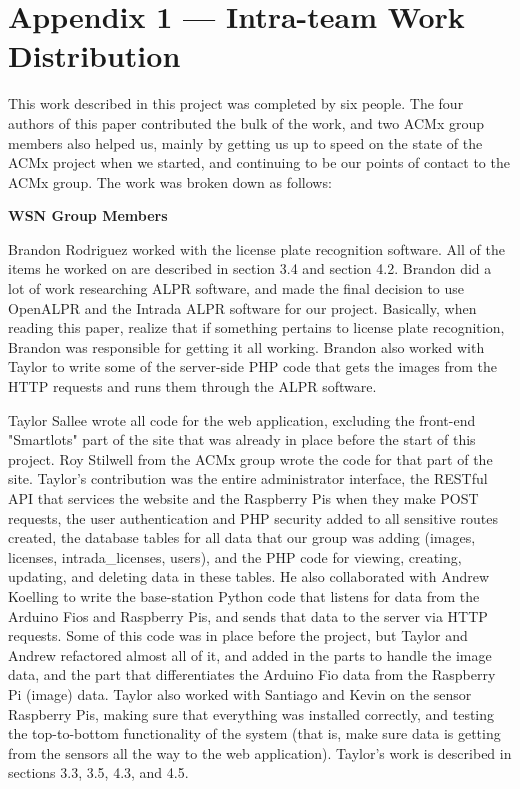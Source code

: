 \documentclass[11pt, oneside, fullpage, doublespace]{article}
\begin{document}
\section*{Appendix 1 --- Intra-team Work Distribution}

This work described in this project was completed by six people. The four authors of this paper contributed the bulk of the work, and two ACMx group members also helped us, mainly by getting us up to speed on the state of the ACMx project when we started, and continuing to be our points of contact to the ACMx group. The work was broken down as follows:

\textbf{WSN Group Members}

Brandon Rodriguez worked with the license plate recognition software. All of the items he worked on are described in section 3.4 and section 4.2. Brandon did a lot of work researching ALPR software, and made the final decision to use OpenALPR and the Intrada ALPR software for our project. Basically, when reading this paper, realize that if something pertains to license plate recognition, Brandon was responsible for getting it all working. Brandon also worked with Taylor to write some of the server-side PHP code that gets the images from the HTTP requests and runs them through the ALPR software.

Taylor Sallee wrote all code for the web application, excluding the front-end "Smartlots" part of the site that was already in place before the start of this project. Roy Stilwell from the ACMx group wrote the code for that part of the site. Taylor's contribution was the entire administrator interface, the RESTful API that services the website and the Raspberry Pis when they make POST requests, the user authentication and PHP security added to all sensitive routes created, the database tables for all data that our group was adding (images, licenses, intrada\_licenses, users), and the PHP code for viewing, creating, updating, and deleting data in these tables. He also collaborated with Andrew Koelling to write the base-station Python code that listens for data from the Arduino Fios and Raspberry Pis, and sends that data to the server via HTTP requests. Some of this code was in place before the project, but Taylor and Andrew refactored almost all of it, and added in the parts to handle the image data, and the part that differentiates the Arduino Fio data from the Raspberry Pi (image) data. Taylor also worked with Santiago and Kevin on the sensor Raspberry Pis, making sure that everything was installed correctly, and testing the top-to-bottom functionality of the system (that is, make sure data is getting from the sensors all the way to the web application). Taylor's work is described in sections 3.3, 3.5, 4.3, and 4.5.
\end{document}
